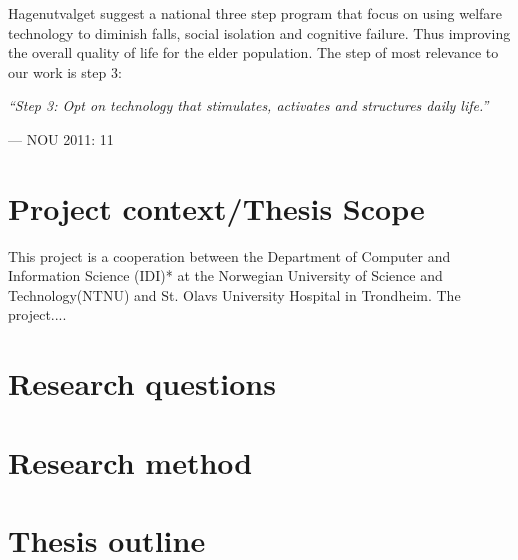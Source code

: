 Hagenutvalget suggest a national three step program that focus on using welfare technology to diminish falls, social isolation and cognitive failure. Thus improving the overall quality of life for the elder population. The step of most relevance to our work is step 3:

\epigraph{\textit{``Step 3: Opt on technology that stimulates, activates and structures daily life.''}}{--- \textup{NOU 2011: 11}}


\section{Project context/Thesis Scope}
This project is a cooperation between the Department of Computer and Information Science (IDI)* at the Norwegian University of Science and Technology(NTNU) and St. Olavs University Hospital in Trondheim. The project....

\section{Research questions}

\section{Research method}

\section{Thesis outline}